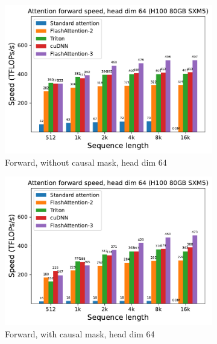 \begin{figure}[!ht]
  \centering
  \begin{subfigure}{.5\textwidth}
    \centering
    \includegraphics[width=.95\linewidth]{figs/flash3_h100_causal_False_hdim_64_fwd_speed.pdf}
    \caption{Forward, without causal mask, head dim 64}
  \end{subfigure}%
  \begin{subfigure}{.5\textwidth}
    \centering
    \includegraphics[width=.95\linewidth]{figs/flash3_h100_causal_True_hdim_64_fwd_speed.pdf}
    \caption{Forward, with causal mask, head dim 64}
  \end{subfigure}
  \begin{subfigure}{.5\textwidth}
    \centering

\end{subfigure}
\end{figure}
